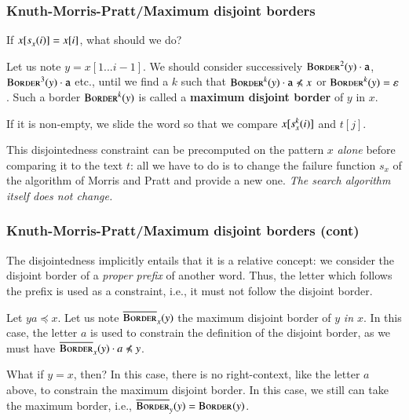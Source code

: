 %
\begin{frame}
\frametitle{Knuth-Morris-Pratt/Maximum disjoint borders}

If \(x[s_{x}^{}(i)] = x[i]\), what should we do?

\bigskip

Let us note \(y=x[1...i-1]\). We should consider successively
\(\textsc{Border}^{2}(y) \cdot \texttt{a}\), \(\textsc{Border}^{3}(y) \cdot \texttt{a}\)
etc., until we find a \(k\) such that \(\Border{k}{y} \cdot \texttt{a}
\npreccurlyeq x\) or \(\textsc{Border}^{k}(y) = \varepsilon\). Such a border
\(\textsc{Border}^{k}(y)\) is called a \textbf{maximum disjoint border} of
\(y\) in \(x\).

\bigskip

If it is non-empty, we slide the word so that we compare
\(x[s_{x}^{k}(i)]\) and \(t[j]\).

\bigskip

This disjointedness constraint can be precomputed on the pattern \(x\)
\emph{alone} before comparing it to the text \(t\): all we have to do
is to change the failure function \(s_{x}\) of the algorithm of Morris
and Pratt and provide a new one. \emph{The search algorithm itself
  does not change.}

\end{frame}

%
\begin{frame}
\frametitle{Knuth-Morris-Pratt/Maximum disjoint borders (cont)}

The disjointedness implicitly entails that it is a relative concept:
we consider the disjoint border of a \emph{proper prefix} of another
word. Thus, the letter which follows the prefix is used as a
constraint, i.e., it must not follow the disjoint border.

\bigskip

Let \(ya \preccurlyeq x\). Let us note \(\overline{\textsc{Border}}_{x}^{}(y)\) the
maximum disjoint border of \(y\) \emph{in \(x\)}. In this case, the
letter \(a\) is used to constrain the definition of the disjoint
border, as we must have \(\DBorder{x}{}{y} \cdot a \npreccurlyeq y\).

\bigskip

What if \(y = x\), then? In this case, there is no right-context, like
the letter \(a\) above, to constrain the maximum disjoint border. In
this case, we still can take the maximum border, i.e., \(\overline{\textsc{Border}}_{y}^{}(y) =
\textsc{Border}^{}(y)\).

\end{frame}

